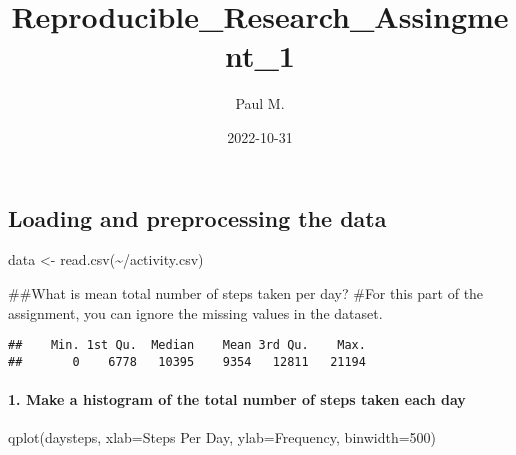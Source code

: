 \documentclass[
]{article}
\title{Reproducible\_Research\_Assingment\_1}
\author{Paul M.}
\date{2022-10-31}
\newenvironment{Shaded}{\begin{snugshade}}{\end{snugshade}}
\newcommand{\AttributeTok}[1]{\textcolor[rgb]{0.77,0.63,0.00}{#1}}
\newcommand{\ConstantTok}[1]{\textcolor[rgb]{0.00,0.00,0.00}{#1}}
\newcommand{\DecValTok}[1]{\textcolor[rgb]{0.00,0.00,0.81}{#1}}
\newcommand{\FunctionTok}[1]{\textcolor[rgb]{0.00,0.00,0.00}{#1}}
\newcommand{\NormalTok}[1]{#1}
\newcommand{\OtherTok}[1]{\textcolor[rgb]{0.56,0.35,0.01}{#1}}
\newcommand{\SpecialCharTok}[1]{\textcolor[rgb]{0.00,0.00,0.00}{#1}}
\newcommand{\StringTok}[1]{\textcolor[rgb]{0.31,0.60,0.02}{#1}}
\begin{document}
\maketitle

\hypertarget{loading-and-preprocessing-the-data}{%
\subsection{Loading and preprocessing the
data}\label{loading-and-preprocessing-the-data}}

\begin{Shaded}
\begin{Highlighting}[]
\NormalTok{data }\OtherTok{\textless{}{-}} \FunctionTok{read.csv}\NormalTok{(}\StringTok{\textquotesingle{}\textasciitilde{}/activity.csv\textquotesingle{}}\NormalTok{)}
\end{Highlighting}
\end{Shaded}

\#\#What is mean total number of steps taken per day? \#For this part of
the assignment, you can ignore the missing values in the dataset.

\begin{Shaded}
\end{Shaded}

\begin{verbatim}
##    Min. 1st Qu.  Median    Mean 3rd Qu.    Max. 
##       0    6778   10395    9354   12811   21194
\end{verbatim}

\hypertarget{make-a-histogram-of-the-total-number-of-steps-taken-each-day}{%
\paragraph{1. Make a histogram of the total number of steps taken each
day}\label{make-a-histogram-of-the-total-number-of-steps-taken-each-day}}

\begin{Shaded}
\begin{Highlighting}[]
\FunctionTok{qplot}\NormalTok{(daysteps, }\AttributeTok{xlab=}\StringTok{\textquotesingle{}Steps Per Day\textquotesingle{}}\NormalTok{, }\AttributeTok{ylab=}\StringTok{\textquotesingle{}Frequency\textquotesingle{}}\NormalTok{, }\AttributeTok{binwidth=}\DecValTok{500}\NormalTok{)}
\end{Highlighting}
\end{Shaded}
\end{document}

